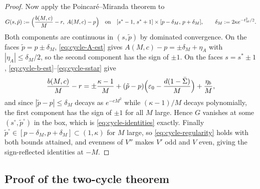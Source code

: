 \begin{proof}
    Now apply the Poincar\'e--Miranda theorem to
    \begin{equation*}
        G(s,\tilde p)
        :=\Bigl(\frac{b(M,c)}M-r,\;A(M,c)-p\Bigr)
        \quad\text{on}\quad
        [s^*-1,\,s^*+1]\times[p-\delta_M,\,p+\delta_M],
        \qquad
        \delta_M:=2\kappa e^{-t_M^2/2}.
    \end{equation*}
    Both components are continuous in $(s,\tilde p)$ by dominated convergence. On the faces
    $\tilde p=p\pm\delta_M$, \eqref{eq:cycle-A-est} gives
    $A(M,c)-p=\pm\delta_M+\eta_A$ with $|\eta_A|\leq\delta_M/2$, so the second component has
    the sign of $\pm1$. On the faces $s=s^*\pm1$,
    \eqref{eq:cycle-b-est}--\eqref{eq:cycle-sstar} give
    \begin{equation*}
        \frac{b(M,c)}M-r
        =\pm\frac{\kappa-1}M
        +(\tilde p-p)\Bigl(\varepsilon_0-\frac{d(1-\bar\Sigma)}M\Bigr)
        +\frac{\eta_b}M,
    \end{equation*}
    and since $|\tilde p-p|\leq\delta_M$ decays as $e^{-cM^2}$ while $(\kappa-1)/M$ decays
    polynomially, the first component has the sign of $\pm1$ for all $M$ large. Hence
    $G$ vanishes at some $(s^\circ,\tilde p^\circ)$ in the box, which is
    \eqref{eq:cycle-identities} exactly. Finally $\tilde p^\circ\in[p-\delta_M,p+\delta_M]
    \subset(1,\kappa)$ for $M$ large, so \eqref{eq:cycle-regularity} holds with both bounds
    attained, and evenness of $V''$ makes $V'$ odd and $V$ even, giving the sign-reflected
    identities at $-M$.
\end{proof}

\subsection{Proof of the two-cycle theorem}

